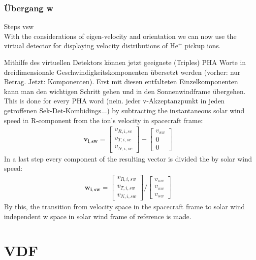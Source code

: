\subsubsection{Übergang w}
Steps vsw
\\
With the considerations of eigen-velocity and orientation we can now use the virtual detector for displaying velocity distributions of $\mathrm{He^{+}}$ pickup ions. 

Mithilfe des virtuellen Detektors können jetzt geeignete (Triples) PHA Worte in dreidimensionale Geschwindigkeitskomponenten übersetzt werden (vorher: nur Betrag. Jetzt: Komponenten).
Erst mit diesen entfalteten Einzelkomponenten kann man den wichtigen Schritt gehen und in den Sonnenwindframe übergehen.
This is done for every PHA word (nein. jeder v-Akzeptanzpunkt in jeden getroffenen Sek-Det-Kombidings...) by subtracting the instantaneous solar wind speed in R-component from the ion's velocity in spacecraft frame: 
\begin{align*}
\mathbf{v_{i,sw}} = \begin{bmatrix}v_{R,i,sc}\\v_{T,i,sc}\\v_{N,i,sc}\end{bmatrix} - \begin{bmatrix}v_{sw}\\0\\0\end{bmatrix}
\end{align*}
In a last step every component of the resulting vector is divided the by solar wind speed:
\begin{align*}
\mathbf{w_{i,sw}} = \begin{bmatrix}v_{R,i,sw}\\v_{T,i,sw}\\v_{N,i,sw}\end{bmatrix} / \begin{bmatrix}v_{sw}\\v_{sw}\\v_{sw}\end{bmatrix}
\end{align*}
By this, the transition from velocity space in the spacecraft frame to solar wind independent w space in solar wind frame of reference is made.
%
%
%
\section{VDF}

%
